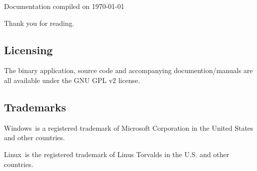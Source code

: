 \documentclass[letterpaper]{article}
\begin{document}
Documentation compiled on \today

Thank you for reading.

\subsection{Licensing}
The binary application, source code and accompanying documention/manuals are all
available under the GNU GPL v2 license.

\subsection{Trademarks}
Windows\textregistered\ is a registered trademark of Microsoft Corporation in the United States and other countries.

Linux\textregistered\ is the registered trademark of Linus Torvalds in the U.S. and other countries.

\setlength{\parindent}{0mm}

\vfill \eject
\printindex
\end{document}
